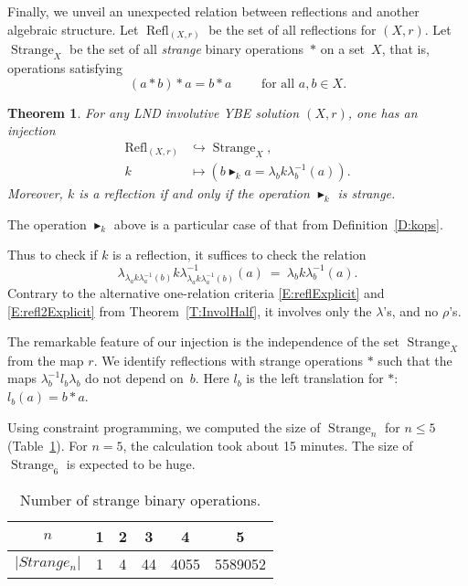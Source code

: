 \documentclass{amsart}
\newcommand{\Refl}{\operatorname{Refl}}
\newcommand{\Strange}{\operatorname{Strange}}
\newcommand\klop{\mathrel{\blacktriangleright_k}}
\theoremstyle{plain}
\newtheorem{thm}{Theorem}[section]
\theoremstyle{definition}
\theoremstyle{remark}
\begin{document}

Finally, we unveil an unexpected relation between reflections and another algebraic structure.  Let $\Refl_{(X,r)}$ be the set of all reflections for $(X,r)$. Let $\Strange_X$ be the set of all \emph{strange} binary operations~$\ast$ on a set~$X$, that is, operations satisfying
\[(a \ast b) \ast a = b \ast a \qquad \text{ for all } a,b \in X.\]

\begin{thm}\label{T:Strange}
For any LND involutive YBE solution $(X,r)$, one has an injection
\begin{align*}
\Refl_{(X,r)} &\hookrightarrow \Strange_X,\\
k &\mapsto (b \klop a= \lambda_b k \lambda_b^{-1} (a)).
\end{align*}
Moreover, $k$ is a reflection if and only if the operation $\klop$ is strange.
\end{thm}

The operation $\klop$ above is a particular case of that from Definition~\ref{D:kops}.

Thus to check if $k$ is a reflection, it suffices to check the relation
\[\lambda_{\lambda_a k \lambda_a^{-1} (b)} k \lambda_{\lambda_a k \lambda_a^{-1} (b)}^{-1} (a) \ = \ \lambda_b k \lambda_b^{-1} (a).\]
Contrary to the alternative one-relation criteria \eqref{E:reflExplicit} and \eqref{E:refl2Explicit} from Theorem~\ref{T:InvolHalf}, it involves only the $\lambda$'s, and no $\rho$'s.

The remarkable feature of our injection is the independence of the set $\Strange_X$ from the map $r$. We identify reflections with strange operations $\ast$ such that the maps $\lambda_b^{-1}l_b\lambda_b$ do not depend on~$b$. Here $l_b$ is the left translation for $\ast$: $l_b(a)=b\ast a$. %


Using constraint programming, we computed the size of $\Strange_n$ for $n\leq 5$ (Table~\ref{Tab}). For $n=5$, the calculation took about 15 minutes. The size of $\Strange_6$ is expected to be huge.

\begin{table}[h]
\begin{tabular}{|c|c|c|c|c|c|}
\hline
$n$ & 1 & 2 & 3 & 4 & 5\tabularnewline
\hline 
$\vert Strange_{n} \vert$ & 1 & 4 & 44 & 4055 & 5589052\tabularnewline
\hline
\end{tabular}
\caption{Number of strange binary operations.}\label{Tab}
\end{table}
\end{document}
